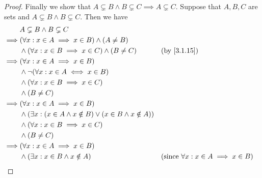 \begin{proof}
	Finally we show that \(A \subsetneq B \land B \subsetneq C \implies A \subsetneq C\).
	Suppose that \(A, B, C\) are sets and \(A \subsetneq B \land B \subsetneq C\).
	Then we have
	\begin{align*}
		         & A \subsetneq B \land B \subsetneq C                                                                                                         \\
		\implies & (\forall x : x \in A \implies x \in B) \land (A \neq B)                                                                                     \\
		         & \land (\forall x : x \in B \implies x \in C) \land (B \neq C)                  &  & \by{3.1.15}                                             \\
		\implies & (\forall x : x \in A \implies x \in B)                                                                                                      \\
		         & \land \lnot(\forall x : x \in A \iff x \in B)                                                                                               \\
		         & \land (\forall x : x \in B \implies x \in C)                                                                                                \\
		         & \land (B \neq C)                                                                                                                            \\
		\implies & (\forall x : x \in A \implies x \in B)                                                                                                      \\
		         & \land (\exists x : (x \in A \land x \notin B) \lor (x \in B \land x \notin A))                                                              \\
		         & \land (\forall x : x \in B \implies x \in C)                                                                                                \\
		         & \land (B \neq C)                                                                                                                            \\
		\implies & (\forall x : x \in A \implies x \in B)                                                                                                      \\
		         & \land (\exists x : x \in B \land x \notin A)                                   &  & \text{(since \(\forall x : x \in A \implies x \in B\))} \\

\end{align*}
\end{proof}
